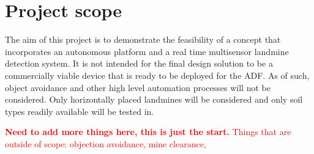 \documentclass[main.tex]{subfiles}
\begin{document}
\section{Project scope}


The aim of this project is to demonstrate the feasibility of a concept that incorporates an autonomous platform and a real time multisensor landmine detection system. It is not intended for the final design solution to be a commercially viable device that is ready to be deployed for the ADF. As of such, object avoidance and other high level automation processes will not be considered. Only horizontally placed landmines will be considered and only soil types readily available will be tested in. 

\textcolor{red}{\textbf{Need to add more things here, this is just the start.} Things that are outside of scope: objection avoidance, mine clearance, }
\end{document}
